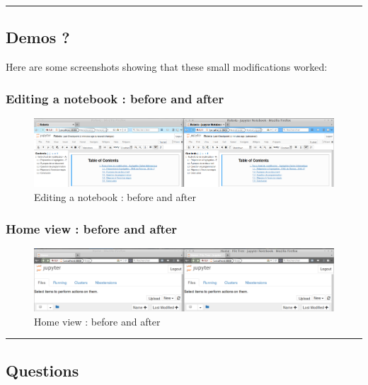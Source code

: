 \documentclass[]{article}
\begin{document}
\begin{center}\rule{0.5\linewidth}{\linethickness}\end{center}

\subsection{Demos ?}\label{demos}

Here are some screenshots showing that these small modifications worked:

\subsubsection{Editing a notebook : before and
after}\label{editing-a-notebook-before-and-after}

\begin{figure}
\centering
\includegraphics{editing_a_notebook.png}
\caption{Editing a notebook : before and after}
\end{figure}

\subsubsection{Home view : before and
after}\label{home-view-before-and-after}

\begin{figure}
\centering
\includegraphics{home_view.png}
\caption{Home view : before and after}
\end{figure}

\begin{center}\rule{0.5\linewidth}{\linethickness}\end{center}

\subsection{Questions}\label{questions}
\end{document}
